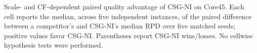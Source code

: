 \caption{Scale- and CF-dependent paired quality advantage of CSG-NI on Core45. Each cell reports the median, across five independent instances, of the paired difference between a competitor's and CSG-NI's median RPD over five matched seeds; positive values favor CSG-NI. Parentheses report CSG-NI wins/losses. No cellwise hypothesis tests were performed.}
